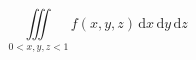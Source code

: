 \documentclass[nofonts]{ctexart}
\newcommand\diff{\, \mathrm{d}}
\begin{document}
\[
	\iiint \limits_{0<x,y,z<1} f(x,y,z)
	\diff{x} \diff{y} \diff{z}
\]
\end{document}
